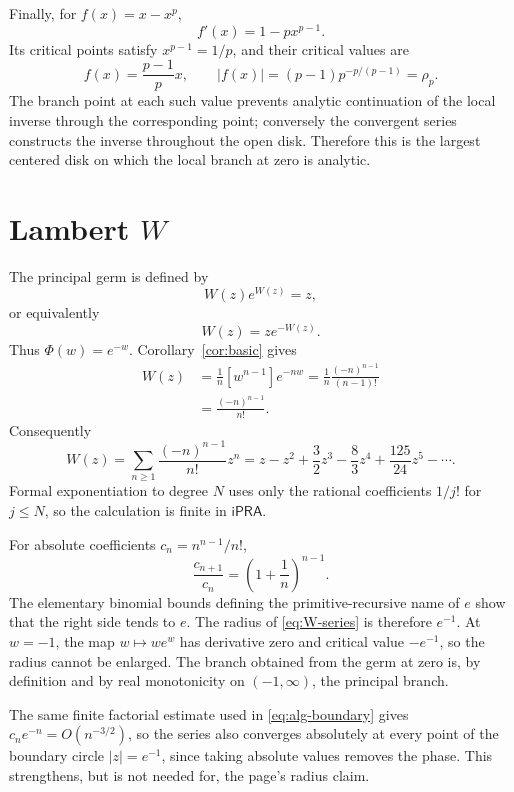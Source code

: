 \documentclass[11pt]{article}
\theoremstyle{definition}
\newcommand{\ipra}{\mathsf{iPRA}}
\begin{document}
Finally, for \(f(x)=x-x^p\),
\[
 f'(x)=1-px^{p-1}.
\]
Its critical points satisfy \(x^{p-1}=1/p\), and their critical values are
\[
 f(x)=\frac{p-1}{p}x,
 \qquad |f(x)|=(p-1)p^{-p/(p-1)}=\rho_p.
\]
The branch point at each such value prevents analytic continuation of the local
inverse through the corresponding point; conversely the convergent series
constructs the inverse throughout the open disk.  Therefore this is the largest
centered disk on which the local branch at zero is analytic.

\section{Lambert \(W\)}\label{sec:lambert}

The principal germ is defined by
\[
 W(z)e^{W(z)}=z,
\]
or equivalently
\[
 W(z)=ze^{-W(z)}.
\]
Thus \(\Phi(w)=e^{-w}\).  Corollary~\ref{cor:basic} gives
\begin{align*}
 [z^n]W(z)
 &=\frac1n[w^{n-1}]e^{-nw}
 =\frac1n\frac{(-n)^{n-1}}{(n-1)!}\\
 &=\frac{(-n)^{n-1}}{n!}.
\end{align*}
Consequently
\begin{equation}\label{eq:W-series}
 W(z)=\sum_{n\ge1}\frac{(-n)^{n-1}}{n!}z^n
 =z-z^2+\frac32z^3-\frac83z^4+\frac{125}{24}z^5-\cdots.
\end{equation}
Formal exponentiation to degree \(N\) uses only the rational coefficients
\(1/j!\) for \(j\le N\), so the calculation is finite in \(\ipra\).

For absolute coefficients \(c_n=n^{n-1}/n!\),
\begin{equation}\label{eq:W-ratio}
 \frac{c_{n+1}}{c_n}=\left(1+\frac1n\right)^{n-1}.
\end{equation}
The elementary binomial bounds defining the primitive-recursive name of \(e\)
show that the right side tends to \(e\).  The radius of
\eqref{eq:W-series} is therefore \(e^{-1}\).  At \(w=-1\), the map
\(w\mapsto we^w\) has derivative zero and critical value \(-e^{-1}\), so the
radius cannot be enlarged.  The branch obtained from the germ at zero is, by
definition and by real monotonicity on \((-1,\infty)\), the principal branch.

The same finite factorial estimate used in
\eqref{eq:alg-boundary} gives
\(c_ne^{-n}=O(n^{-3/2})\), so the series also converges absolutely at every
point of the boundary circle \(\lvert z\rvert=e^{-1}\), since taking absolute
values removes the phase.  This strengthens, but is not needed for, the page's radius claim.
\end{document}
